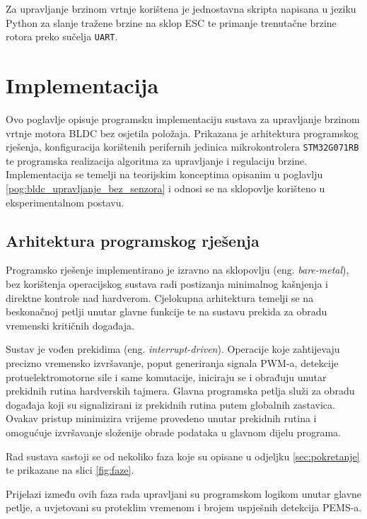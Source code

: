\documentclass[diplomskirad, upload]{fer}
\begin{document}
Za upravljanje brzinom vrtnje korištena je jednostavna skripta napisana u
jeziku Python za slanje tražene brzine na sklop ESC te primanje trenutačne
brzine rotora preko sučelja \texttt{UART}.

\chapter{Implementacija}
\label{pog:implementacija}

Ovo poglavlje opisuje programsku implementaciju sustava za upravljanje brzinom
vrtnje motora BLDC bez osjetila položaja. Prikazana je arhitektura programskog
rješenja, konfiguracija korištenih perifernih jedinica mikrokontrolera
\texttt{STM32G071RB} te programska realizacija algoritma za upravljanje i
regulaciju brzine. Implementacija se temelji na teorijskim konceptima opisanim
u poglavlju \ref{pog:bldc_upravljanje_bez_senzora} i odnosi se na sklopovlje
korišteno u eksperimentalnom postavu.

\section{Arhitektura programskog rješenja}
\label{sec:arhitektura_rjesenja}

Programsko rješenje implementirano je izravno na sklopovlju (eng.
\textit{bare-metal}), bez korištenja operacijskog sustava radi postizanja
minimalnog kašnjenja i direktne kontrole nad hardverom. Cjelokupna arhitektura
temelji se na beskonačnoj petlji unutar glavne funkcije te na sustavu prekida
za obradu vremenski kritičnih događaja.

Sustav je vođen prekidima (eng. \textit{interrupt-driven}). Operacije koje
zahtijevaju precizno vremensko izvršavanje, poput generiranja signala PWM-a,
detekcije protuelektromotorne sile i same komutacije, iniciraju se i obrađuju
unutar prekidnih rutina hardverskih tajmera. Glavna programska petlja služi za
obradu događaja koji su signalizirani iz prekidnih rutina putem globalnih
zastavica. Ovakav pristup minimizira vrijeme provedeno unutar prekidnih rutina
i omogućuje izvršavanje složenije obrade podataka u glavnom dijelu programa.

Rad sustava sastoji se od nekoliko faza koje su opisane u odjeljku
\ref{sec:pokretanje} te prikazane na slici \ref{fig:faze}.

Prijelazi između ovih faza rada upravljani su programskom logikom unutar glavne
petlje, a uvjetovani su proteklim vremenom i brojem uspješnih detekcija PEMS-a.
\end{document}
